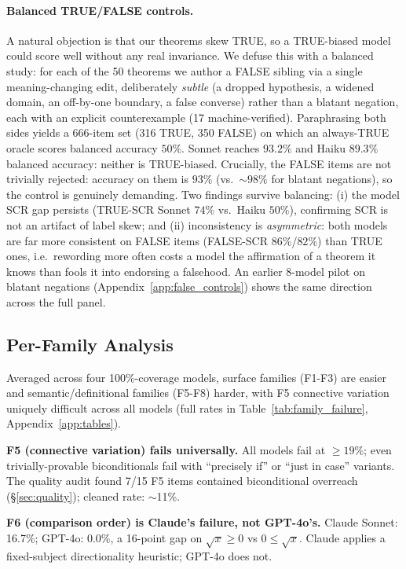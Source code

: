 \documentclass{article}
\begin{document}
\paragraph{Balanced TRUE/FALSE controls.}
\label{sec:false_controls}
A natural objection is that our theorems skew TRUE, so a TRUE-biased model could score well without any real invariance. We defuse this with a balanced study: for each of the 50 theorems we author a FALSE sibling via a single meaning-changing edit, deliberately \emph{subtle} (a dropped hypothesis, a widened domain, an off-by-one boundary, a false converse) rather than a blatant negation, each with an explicit counterexample (17 machine-verified). Paraphrasing both sides yields a 666-item set (316 TRUE, 350 FALSE) on which an always-TRUE oracle scores balanced accuracy $50\%$. Sonnet reaches $93.2\%$ and Haiku $89.3\%$ balanced accuracy: neither is TRUE-biased. Crucially, the FALSE items are not trivially rejected: accuracy on them is $93\%$ (vs.\ ${\sim}98\%$ for blatant negations), so the control is genuinely demanding. Two findings survive balancing: (i) the model SCR gap persists (TRUE-SCR Sonnet $74\%$ vs.\ Haiku $50\%$), confirming SCR is not an artifact of label skew; and (ii) inconsistency is \emph{asymmetric}: both models are far more consistent on FALSE items (FALSE-SCR $86\%$/$82\%$) than TRUE ones, i.e.\ rewording more often costs a model the affirmation of a theorem it knows than fools it into endorsing a falsehood. An earlier 8-model pilot on blatant negations (Appendix~\ref{app:false_controls}) shows the same direction across the full panel.

\subsection{Per-Family Analysis}

Averaged across four 100\%-coverage models, surface families (F1-F3) are easier and semantic/definitional families (F5-F8) harder, with F5 connective variation uniquely difficult across all models (full rates in Table~\ref{tab:family_failure}, Appendix~\ref{app:tables}).

\textbf{F5 (connective variation) fails universally.}
All models fail at $\geq 19\%$; even trivially-provable biconditionals fail with ``precisely if'' or ``just in case'' variants.
The quality audit found 7/15 F5 items contained biconditional overreach (\S\ref{sec:quality}); cleaned rate: $\sim$11\%.

\textbf{F6 (comparison order) is Claude's failure, not GPT-4o's.}
Claude Sonnet: 16.7\%; GPT-4o: 0.0\%, a 16-point gap on $\sqrt{x}{\geq}0$ vs $0{\leq}\sqrt{x}$.
Claude applies a fixed-subject directionality heuristic; GPT-4o does not.
\end{document}
